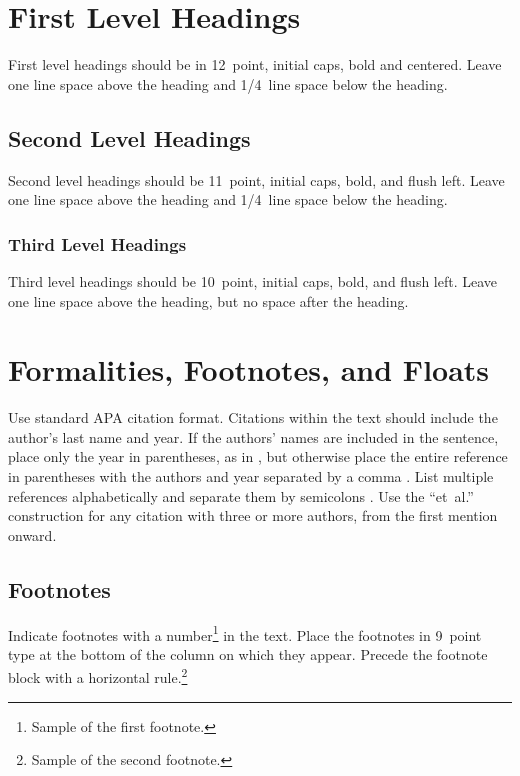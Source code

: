 \documentclass{ccn}  %
\begin{document}
\section{First Level Headings}

First level headings should be in 12~point, initial caps, bold and centered.
Leave one line space above the heading and 1/4~line space below the heading.

\subsection{Second Level Headings}

Second level headings should be 11~point, initial caps, bold, and flush left.
Leave one line space above the heading and 1/4~line space below the heading.

\subsubsection{Third Level Headings}

Third level headings should be 10~point, initial caps, bold, and flush left.
Leave one line space above the heading, but no space after the heading.

\section{Formalities, Footnotes, and Floats}

Use standard APA citation format.
Citations within the text should include the author's last name and year.
If the authors' names are included in the sentence, place only the year in parentheses,
as in \citet{NewellSimon1972a}, but otherwise place the entire reference in parentheses
with the authors and year separated by a comma \citep{NewellSimon1972a}.
List multiple references alphabetically and separate them by semicolons
\citep{ChalnickBillman1988a,NewellSimon1972a}.
Use the ``et~al.'' construction for any citation with three or more authors,
from the first mention onward.

\subsection{Footnotes}

Indicate footnotes with a number\footnote{Sample of the first footnote.} in the text.
Place the footnotes in 9~point type at the bottom of the column on which they appear.
Precede the footnote block with a horizontal rule.\footnote{Sample of the second
  footnote.}
\end{document}
